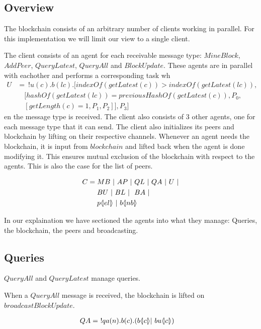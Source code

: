 \subsection{Overview}

The blockchain consists of an arbitrary number of clients working in parallel. For this implementation we will limit our view to a single client.

The client consists of an agent for each receivable message type: $MineBlock$, $AddPeer$, $QueryLatest$, $QueryAll$ and $BlockUpdate$.
These agents are in parallel with eachother and performs a corresponding task wh
\begin{align*}
	U &=\ !u(c).b(lc).[indexOf( getLatest(c))>indexOf(getLatest(lc)),\\
	&\quad[hashOf(getLatest(lc))=previousHashOf(getLatest(c)),P_0,\\ &\quad[getLength(c)=1,P_1,P_2]],P_3]
\end{align*}en the message type is received.
The client also consists of 3 other agents, one for each message type that it can send.
The client also initializes its peers and blockchain by lifting on their respective channels.
Whenever an agent needs the blockchain, it is input from $blockchain$ and lifted back when the agent is done modifying it.
This ensures mutual exclusion of the blockchain with respect to the agents.
This is also the case for the list of peers.

\begin{align*}
    C &= MB\ |\ AP\ |\ QL\ |\ QA\ |\ U\ |\\
    &\quad \ BU\ |\ BL\ |\ \ BA\ |\\
    &\quad \ p \langle \! | el | \! \rangle\ |\ b \langle \! | nb | \! \rangle
\end{align*}

In our explaination we have sectioned the agents into what they manage: Queries, the blockchain, the peers and broadcasting.

\subsection{Queries}

$QueryAll$ and $QueryLatest$ manage queries.

When a $QueryAll$ message is received, the blockchain is lifted on $broadcastBlockUpdate$.

\begin{align*}
    QA &=\ !qa(n).b(c).(b \langle \! | c | \! \rangle| \ bu \langle \! | c | \! \rangle)
\end{align*}

